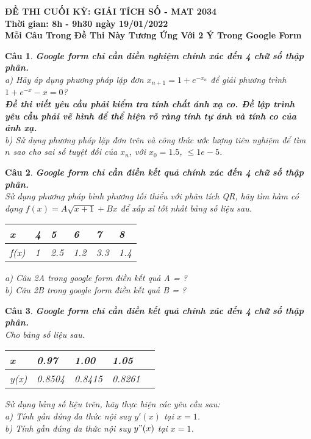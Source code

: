 \documentclass[11pt]{article}
\newtheorem{bt}{Câu}
\begin{document}


\begin{center}
	\textbf{ĐỀ THI CUỐI KỲ: GIẢI TÍCH SỐ - MAT 2034 \\ Thời gian: 8h - 9h30 ngày 19/01/2022 \\ Mỗi Câu Trong Đề Thi Này Tương Ứng Với 2 Ý Trong Google Form } 
\end{center}

\begin{bt} \textbf{Google form chỉ cần điền nghiệm chính xác đến 4 chữ số thập phân.} \\
a) Hãy áp dụng phương pháp lặp đơn $x_{n+1} = 1 + e^{-x_n}$ để giải phương trình $ 1 + e^{-x} - x  = 0 $? \\
\textbf{Đề thi viết yêu cầu phải kiểm tra tính chất ánh xạ co. Đề lập trình yêu cầu phải vẽ hình để thể hiện rõ ràng tính tự ánh và tính co của ánh xạ.} \\
b) Sử dụng phương pháp lặp đơn trên và công thức ước lượng tiên nghiệm để tìm $n$ sao cho sai số tuyệt đối của $x_n$, với $x_0 = 1.5$,
$\leq 1e-5$.
\end{bt}


\begin{bt} \textbf{Google form chỉ cần điền kết quả chính xác đến 4 chữ số thập phân.} \\
Sử dụng phương pháp bình phương tối thiểu với phân tích QR, hãy tìm hàm có dạng $f(x) = A \sqrt{x+1}+ Bx$ để xấp xỉ tốt nhất bảng số liệu sau. 
\begin{center}
	\begin{tabular}[5]{l|l|l|l|l|l}
		x    & 4 & 5 & 6 & 7 & 8 \\ \hline
		f(x) & 1 & 2.5 & 1.2 & 3.3 & 1.4 \\
	\end{tabular}	
\end{center}
% 
a) Câu 2A trong google form điền kết quả A = ? \\
b) Câu 2B trong google form điền kết quả B = ? \\
\end{bt}

\begin{bt} \textbf{Google form chỉ cần điền kết quả chính xác đến 4 chữ số thập phân.} \\
Cho bảng số liệu sau. 
\begin{center}
	\begin{tabular}[5]{l|l|l|l|l} 
		x    & 0.97 & 1.00 & 1.05 \\ \hline
		y(x) & 0.8504 & 0.8415 & 0.8261 \\
	\end{tabular}	
\end{center}
% 
Sử dụng bảng số liệu trên, hãy thực hiện các yêu cầu sau: \\
a) Tính gần đúng đa thức nội suy $y'(x)$ tại $x=1$.\\
b) Tính gần đúng đa thức nội suy $y"(x)$ tại $x=1$.	
\end{bt}
\end{document}
